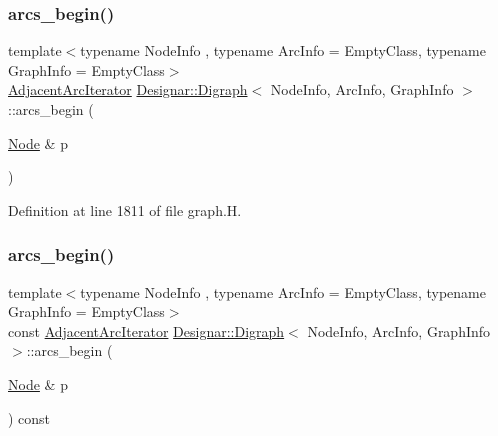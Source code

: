 \subsubsection{\texorpdfstring{arcs\+\_\+begin()}{arcs\_begin()}\hspace{0.1cm}{\footnotesize\ttfamily [3/4]}}
{\footnotesize\ttfamily template$<$typename Node\+Info , typename Arc\+Info  = Empty\+Class, typename Graph\+Info  = Empty\+Class$>$ \\
\hyperlink{class_designar_1_1_digraph_1_1_adjacent_arc_iterator}{Adjacent\+Arc\+Iterator} \hyperlink{class_designar_1_1_digraph}{Designar\+::\+Digraph}$<$ Node\+Info, Arc\+Info, Graph\+Info $>$\+::arcs\+\_\+begin (\begin{DoxyParamCaption}\item[{\hyperlink{class_designar_1_1_digraph_a4dc921c41a480b7946a04170e997d8ae}{Node} \&}]{p }\end{DoxyParamCaption})\hspace{0.3cm}{\ttfamily [inline]}}



Definition at line 1811 of file graph.\+H.

\mbox{\label{class_designar_1_1_digraph_aa17a29b3ea956a3ad98e991fb13d0a20}} 
\subsubsection{\texorpdfstring{arcs\+\_\+begin()}{arcs\_begin()}\hspace{0.1cm}{\footnotesize\ttfamily [4/4]}}
{\footnotesize\ttfamily template$<$typename Node\+Info , typename Arc\+Info  = Empty\+Class, typename Graph\+Info  = Empty\+Class$>$ \\
const \hyperlink{class_designar_1_1_digraph_1_1_adjacent_arc_iterator}{Adjacent\+Arc\+Iterator} \hyperlink{class_designar_1_1_digraph}{Designar\+::\+Digraph}$<$ Node\+Info, Arc\+Info, Graph\+Info $>$\+::arcs\+\_\+begin (\begin{DoxyParamCaption}\item[{\hyperlink{class_designar_1_1_digraph_a4dc921c41a480b7946a04170e997d8ae}{Node} \&}]{p }\end{DoxyParamCaption}) const\hspace{0.3cm}{\ttfamily [inline]}}



